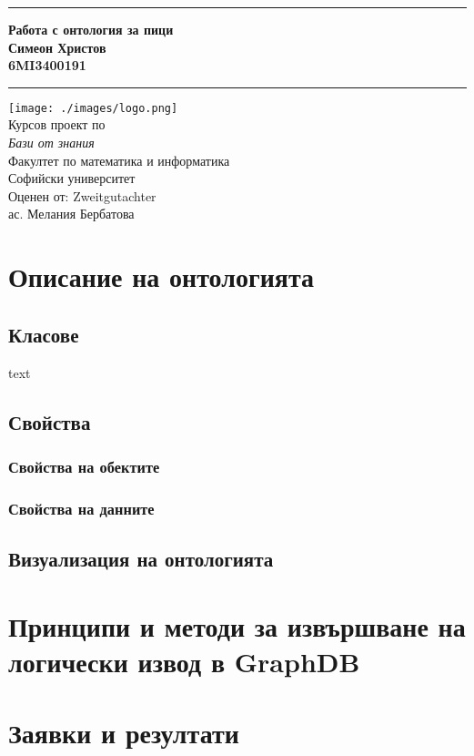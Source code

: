 \documentclass[12pt]{article}
\newcommand{\JMUTitle}[9]{

  \thispagestyle{empty}
  \vspace*{\stretch{1}}
  {\parindent0cm
  \rule{\linewidth}{.7ex}}
  \begin{flushright}
    \vspace*{\stretch{1}}
    \sffamily\bfseries\Huge
    #1\\
    \vspace*{\stretch{1}}
    \sffamily\bfseries\large
    #2\\
    \vspace*{\stretch{1}}
    \sffamily\bfseries\small
    #3
  \end{flushright}
  \rule{\linewidth}{.7ex}

  \vspace*{\stretch{1}}
  \begin{center}
    \texttt{[image: ./images/logo.png]} \\
    \vspace*{\stretch{1}}
    \Large Курсов проект по \\ \textit{Бази от знания} \\

    \vspace*{\stretch{2}}
    \large Факултет по математика и информатика\\
    \large Софийски университет\\
    
    \vspace*{\stretch{1}}
    \large Оценен от:  #8 \\[1mm]
    
    \vspace*{\stretch{1}}
    \large #7 \\

  \end{center}
}
\begin{document}
  

  \JMUTitle
      {Работа с онтология за пици}
      {Симеон Христов}
      {6MI3400191}
      
      {Wirtschaftswissenschaftlichen Fakultät}  %
      {W"urzburg 2018}                          %
      {Юни 2023}                              %
      {ас. Мелания Бербатова}               %
      {Zweitgutachter}                          %

  \clearpage

\tableofcontents

\clearpage

\section{Описание на онтологията}

    \subsection{Класове}

    text

    \subsection{Свойства}

        \subsubsection{Свойства на обектите}

        \subsubsection{Свойства на данните}

    \subsection{Визуализация на онтологията}

\section{Принципи и методи за извършване на логически извод в GraphDB}

\section{Заявки и резултати}
\end{document}
